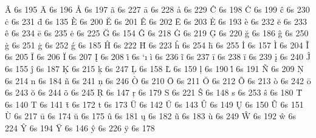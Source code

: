 \accentdef  \~ A    6s  195
\accentdef  \= A    6s  196
\accentdef  \r A    6s  197
\accentdef  \~ a    6s  227
\accentdef  \= a    6s  228
\accentdef  \r a    6s  229
\accentdef  \^ C    6s  198
\accentdef  \. C    6s  199
\accentdef  \^ c    6s  230
\accentdef  \. c    6s  231
\accentdef  \= d    6s  135
\accentdef  \` E    6s  200
\accentdef  \u E    6s  201
\accentdef  \^ E    6s  202
\accentdef  \= E    6s  203
\accentdef  \. E    6s  193
\accentdef  \` e    6s  232
\accentdef  \u e    6s  233
\accentdef  \^ e    6s  234
\accentdef  \= e    6s  235
\accentdef  \. e    6s  225
\accentdef  \u G    6s  154
\accentdef  \^ G    6s  218
\accentdef  \. G    6s  219
\accentdef  \c G    6s  220
\accentdef  \u g    6s  186
\accentdef  \^ g    6s  250
\accentdef  \. g    6s  251
\accentdef  \c g    6s  252
\accentdef  \' g    6s  185
\accentdef  \^ H    6s  222
\accentdef  \= H    6s  223
\accentdef  \^ h    6s  254
\accentdef  \= h    6s  255
\accentdef  \. I    6s  157
\accentdef  \` I    6s  204
\accentdef  \~ I    6s  205
\accentdef  \= I    6s  206
\accentdef  \" I    6s  207
\accentdef  \k I    6s  208
\accentdef  \. i    6s  `\i
\accentdef  \` i    6s  236
\accentdef  \~ i    6s  237
\accentdef  \= i    6s  238
\accentdef  \" i    6s  239
\accentdef  \k i    6s  240
\accentdef  \^ J    6s  155
\accentdef  \^ j    6s  187
\accentdef  \c K    6s  215
\accentdef  \c k    6s  247
\accentdef  \c L    6s  158
\accentdef  \. L    6s  159
\accentdef  \c l    6s  190
\accentdef  \. l    6s  191
\accentdef  \~ N    6s  209
\accentdef  \c N    6s  214
\accentdef  \m n    6s  184
\accentdef  \~ n    6s  241
\accentdef  \c n    6s  246
\accentdef  \` O    6s  210
\accentdef  \= O    6s  211
\accentdef  \u O    6s  212
\accentdef  \~ O    6s  213
\accentdef  \` o    6s  242
\accentdef  \= o    6s  243
\accentdef  \u o    6s  244
\accentdef  \~ o    6s  245
\accentdef  \c R    6s  147
\accentdef  \c r    6s  179
\accentdef  \m S    6s  221
\accentdef  \^ S    6s  148
\accentdef  \m s    6s  253
\accentdef  \^ s    6s  180
\accentdef  \= T    6s  140
\accentdef  \m T    6s  141
\accentdef  \= t    6s  172
\accentdef  \m t    6s  173
\accentdef  \= U    6s  142
\accentdef  \u U    6s  143
\accentdef  \^ U    6s  149
\accentdef  \k U    6s  150
\accentdef  \~ U    6s  151
\accentdef  \` U    6s  217
\accentdef  \= u    6s  174
\accentdef  \u u    6s  175
\accentdef  \^ u    6s  181
\accentdef  \k u    6s  182
\accentdef  \~ u    6s  183
\accentdef  \` u    6s  249
\accentdef  \^ W    6s  192
\accentdef  \^ w    6s  224
\accentdef  \^ Y    6s  194
\accentdef  \" Y    6s  146
\accentdef  \^ y    6s  226
\accentdef  \" y    6s  178

